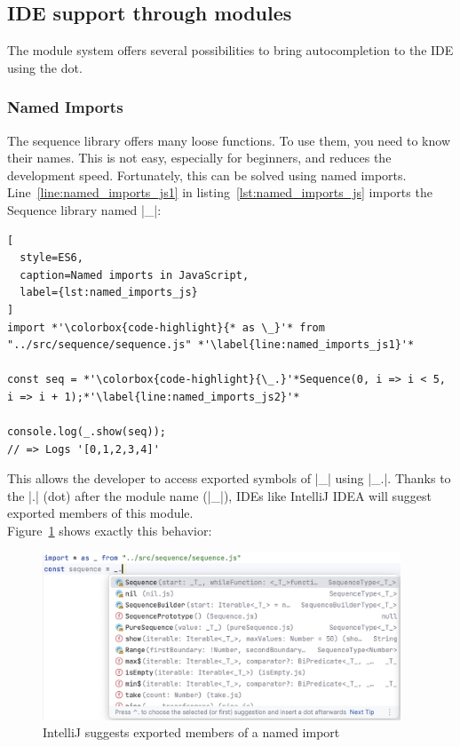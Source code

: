 \subsection{IDE support through modules} %
\label{sub:IDE support through modules}
The module system offers several possibilities to bring autocompletion to
the IDE using the dot.
\subsubsection{Named Imports} %
\label{subsub:Named Imports}
The sequence library offers many loose functions. To use them, you need to know
their names. This is not easy, especially for beginners, and reduces the
development speed. Fortunately, this can be solved using named imports.
Line~\ref{line:named_imports_js1} in listing~\ref{lst:named_imports_js} imports
the Sequence library named |_|:

\begin{lstlisting}[
  style=ES6,
  caption=Named imports in JavaScript,
  label={lst:named_imports_js}
]
import *'\colorbox{code-highlight}{* as \_}'* from "../src/sequence/sequence.js" *'\label{line:named_imports_js1}'*

const seq = *'\colorbox{code-highlight}{\_.}'*Sequence(0, i => i < 5, i => i + 1);*'\label{line:named_imports_js2}'*

console.log(_.show(seq));
// => Logs '[0,1,2,3,4]'
\end{lstlisting}
This allows the developer to access exported symbols of |_| using |_.|. Thanks
to the |.| (dot) after the module name (|_|), IDEs like IntelliJ IDEA will
suggest exported members of this module.\\
Figure~\ref{fig:the_power_of_the_dot_idea_sugg} shows exactly this behavior:

\begin{figure}[H]
  \begin{center}
    \includegraphics[width=0.95\textwidth]{mainmatter/pictures/the-power-of-the-dot-intellj.jpg}
  \end{center}
  \caption{IntelliJ suggests exported members of a named import}
  \label{fig:the_power_of_the_dot_idea_sugg}
\end{figure}

